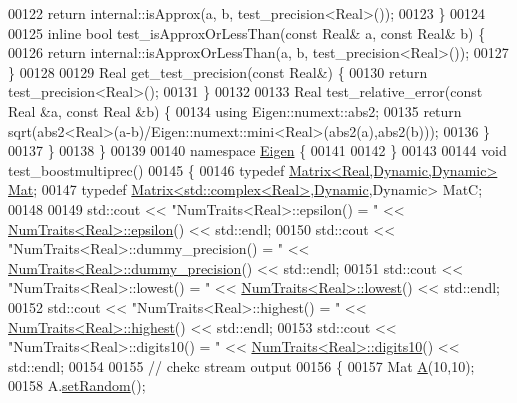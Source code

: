 \begin{DoxyCode}
00122     \textcolor{keywordflow}{return} internal::isApprox(a, b, test\_precision<Real>());
00123   \}
00124 
00125   \textcolor{keyword}{inline} \textcolor{keywordtype}{bool} test\_isApproxOrLessThan(\textcolor{keyword}{const} Real& a, \textcolor{keyword}{const} Real& b) \{
00126     \textcolor{keywordflow}{return} internal::isApproxOrLessThan(a, b, test\_precision<Real>());
00127   \}
00128 
00129   Real get\_test\_precision(\textcolor{keyword}{const} Real&) \{
00130     \textcolor{keywordflow}{return} test\_precision<Real>();
00131   \}
00132 
00133   Real test\_relative\_error(\textcolor{keyword}{const} Real &a, \textcolor{keyword}{const} Real &b) \{
00134     \textcolor{keyword}{using} Eigen::numext::abs2;
00135     \textcolor{keywordflow}{return} sqrt(abs2<Real>(a-b)/Eigen::numext::mini<Real>(abs2(a),abs2(b)));
00136   \}
00137 \}
00138 \}
00139 
00140 \textcolor{keyword}{namespace }\hyperlink{namespace_eigen}{Eigen} \{
00141 
00142 \}
00143 
00144 \textcolor{keywordtype}{void} test\_boostmultiprec()
00145 \{
00146   \textcolor{keyword}{typedef} \hyperlink{group___core___module_class_eigen_1_1_matrix}{Matrix<Real,Dynamic,Dynamic>} \hyperlink{group___core___module}{Mat};
00147   \textcolor{keyword}{typedef} \hyperlink{group___core___module_class_eigen_1_1_matrix}{Matrix<std::complex<Real>},\hyperlink{namespace_eigen_ad81fa7195215a0ce30017dfac309f0b2}{Dynamic},Dynamic> MatC;
00148 
00149   std::cout << \textcolor{stringliteral}{"NumTraits<Real>::epsilon()         = "} << 
      \hyperlink{group___core___module_struct_eigen_1_1_num_traits}{NumTraits<Real>::epsilon}() << std::endl;
00150   std::cout << \textcolor{stringliteral}{"NumTraits<Real>::dummy\_precision() = "} << 
      \hyperlink{group___core___module_struct_eigen_1_1_num_traits}{NumTraits<Real>::dummy\_precision}() << std::endl;
00151   std::cout << \textcolor{stringliteral}{"NumTraits<Real>::lowest()          = "} << 
      \hyperlink{group___core___module_struct_eigen_1_1_num_traits}{NumTraits<Real>::lowest}() << std::endl;
00152   std::cout << \textcolor{stringliteral}{"NumTraits<Real>::highest()         = "} << 
      \hyperlink{group___core___module_struct_eigen_1_1_num_traits}{NumTraits<Real>::highest}() << std::endl;
00153   std::cout << \textcolor{stringliteral}{"NumTraits<Real>::digits10()        = "} << 
      \hyperlink{group___core___module_struct_eigen_1_1_num_traits}{NumTraits<Real>::digits10}() << std::endl;
00154 
00155   \textcolor{comment}{// chekc stream output}
00156   \{
00157     Mat \hyperlink{group___core___module_class_eigen_1_1_matrix}{A}(10,10);
00158     A.\hyperlink{class_eigen_1_1_plain_object_base_af0e576a0e1aefc9ee346de44cc352ba3}{setRandom}();

\end{DoxyCode}
